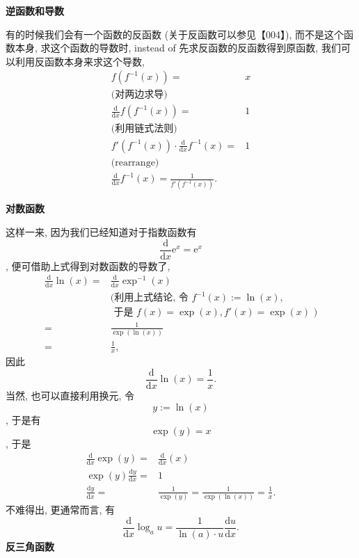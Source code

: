 \textbf{逆函数和导数}

有的时候我们会有一个函数的反函数 (关于反函数可以参见【004】),
而不是这个函数本身, 求这个函数的导数时, instead of
先求反函数的反函数得到原函数, 我们可以利用反函数本身来求这个导数, \[
\begin{aligned}
f(f^{-1}(x))=&x\\
\text{(对两边求导)}\\
\frac{\mathrm{d}}{\mathrm{d}x}f(f^{-1}(x))=&1\\
\text{(利用链式法则)}\\
f'(f^{-1}(x))\cdot\frac{\mathrm{d}}{\mathrm{d}x}f^{-1}(x)=&1\\
\text{(rearrange)}\\
\boxed{\frac{\mathrm{d}}{\mathrm{d}x}f^{-1}(x)=\frac{1}{f'(f^{-1}(x))}}.
\end{aligned}
\]

\textbf{对数函数}

这样一来, 因为我们已经知道对于指数函数有
\[\frac{\mathrm{d}}{\mathrm{d}x}\mathrm{e}^x=\mathrm{e}^x\],
便可借助上式得到对数函数的导数了, \[
\begin{aligned}
\frac{\mathrm{d}}{\mathrm{d}x}\ln(x)=&\frac{\mathrm{d}}{\mathrm{d}x}\exp^{-1}(x)\\
&\text{(利用上式结论, 令 }f^{-1}(x):=\ln(x),\\
&\text{ 于是 }f(x)=\exp(x), f'(x)=\exp(x)\text{ )}\\
=&\frac{1}{\exp(\ln(x))}\\
=&\frac{1}{x},
\end{aligned}
\] 因此 \[
\boxed{\frac{\mathrm{d}}{\mathrm{d}x}\ln(x)=\frac{1}{x}}.
\] 当然, 也可以直接利用换元, 令 \[y:=\ln(x)\], 于是有 \[\exp(y)=x\],
于是 \[
\begin{aligned}
\frac{\mathrm{d}}{\mathrm{d}x}\exp(y)=&\frac{\mathrm{d}}{\mathrm{d}x}(x)\\
\exp(y)\frac{\mathrm{d}y}{\mathrm{d}x}=&1\\
\frac{\mathrm{d}y}{\mathrm{d}x}=&\frac{1}{\exp(y)}=\frac{1}{\exp(\ln(x))}=\frac{1}{x}.
\end{aligned}
\] 不难得出, 更通常而言, 有 \[
\boxed{\frac{\mathrm{d}}{\mathrm{d}x}\log_au=\frac{1}{\ln(a)\cdot u}\frac{\mathrm{d}u}{\mathrm{d}x}}.
\] \textbf{反三角函数}

